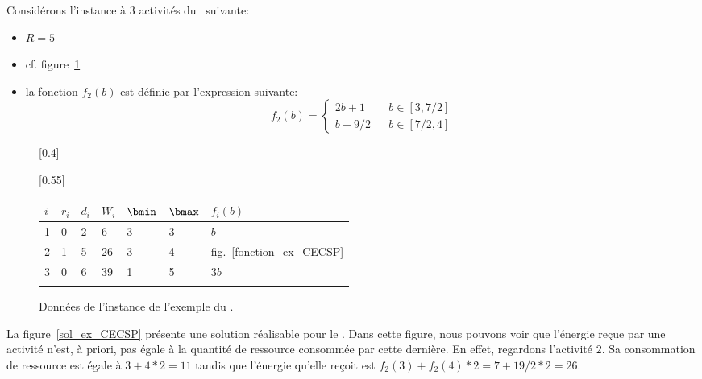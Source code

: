 \begin{ex}
Considérons l'instance à $3$ activités du \CECSP~suivante:
\begin{itemize}
\item $R=5$
\item cf. figure~\ref{ex_CECSP}
\item la fonction $f_2(b)$ est définie par l'expression suivante: 
\[f_2(b)=\left\{
\begin{array}{lll}
2b+1 & & b \in [3,7/2]\\
b+9/2 & & b \in [7/2,4]
\end{array}
\right.\]
\end{itemize}
\begin{figure}[!htb]
\centering
{}[0.4\linewidth]{
}
\hfill
\subcaptionbox{}[0.55\linewidth]{
  \begin{tabular}{|M{0.6cm}|M{0.6cm}M{0.6cm}M{0.6cm}M{0.6cm}M{0.6cm}M{1.2cm}|}
    \hline
    $i$ & $r_i$ & $d_i$ & $W_i$ & $\bmin$ & $\bmax$ & $f_i(b)$\\[2mm]
 & 0 & 2 & 6 & 3 & 3 & $b$\\[2mm]
    2 & 1 & 5 & 26 & 3 & 4 & fig.~\ref{fonction_ex_CECSP}\\[2mm]
    3 & 0 & 6 & 39 & 1 & 5 & $3b$\\[2mm]
    \hline
  \end{tabular}} 
\caption{Données de l'instance de l'exemple du \CECSP.}
\label{ex_CECSP}
\end{figure}
La figure~\ref{sol_ex_CECSP} présente une solution réalisable pour le
\CECSP. Dans cette figure, nous pouvons voir que l'énergie reçue par une
activité n'est, à priori, pas égale à la quantité de ressource
consommée par cette dernière. En effet, regardons l'activité $2$. Sa
consommation de ressource est égale à $3 + 4 * 2 = 11$ tandis que
l'énergie qu'elle reçoit est $f_2(3)+ f_2(4) * 2 = 7 + 19/2 * 2 =26$.


\end{ex}
